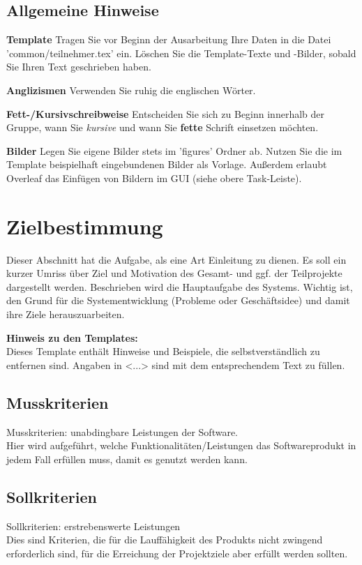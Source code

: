 
\section{Allgemeine Hinweise}
\textbf{Template} Tragen Sie vor Beginn der Ausarbeitung Ihre Daten in die Datei 'common/teilnehmer.tex' ein. Löschen Sie die Template-Texte und -Bilder, sobald Sie Ihren Text geschrieben haben.

\textbf{Anglizismen} Verwenden Sie ruhig die englischen Wörter.

\textbf{Fett-/Kursivschreibweise} Entscheiden Sie sich zu Beginn innerhalb der Gruppe, wann Sie \textit{kursive} und wann Sie \textbf{fette} Schrift einsetzen möchten.

\textbf{Bilder} Legen Sie eigene Bilder stets im 'figures' Ordner ab. Nutzen Sie die im Template beispielhaft eingebundenen Bilder als Vorlage. Außerdem erlaubt Overleaf das Einfügen von Bildern im GUI (siehe obere Task-Leiste).


\chapter{Zielbestimmung}
\label{chap:target}

Dieser Abschnitt hat die Aufgabe, als eine Art Einleitung zu dienen. Es soll
ein kurzer Umriss über Ziel und Motivation des Gesamt- und ggf. der
Teilprojekte dargestellt werden. Beschrieben wird die Hauptaufgabe des Systems.
Wichtig ist, den Grund für die Systementwicklung (Probleme oder Geschäftsidee)
und damit ihre Ziele herauszuarbeiten.

\textbf{Hinweis zu den Templates:}\\
Dieses Template enthält Hinweise und Beispiele, die selbstverständlich zu entfernen sind. 
Angaben in <...> sind mit dem entsprechendem Text zu füllen.

\section{Musskriterien}\label{sec:musskriterien}
Musskriterien: unabdingbare Leistungen der Software. \\
Hier wird aufgeführt, welche Funktionalitäten/Leistungen das Softwareprodukt in
jedem Fall erfüllen muss, damit es genutzt werden kann.


\section{Sollkriterien}\label{sec:sollkriterien}
Sollkriterien: erstrebenswerte Leistungen\\
Dies sind Kriterien, die für die Lauffähigkeit des Produkts nicht zwingend
erforderlich sind, für die Erreichung der Projektziele aber erfüllt werden
sollten.

